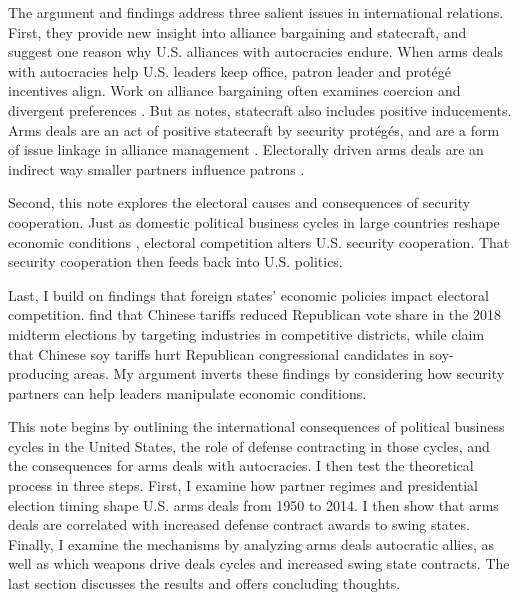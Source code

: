\documentclass[12pt]{article}
\begin{document}


The argument and findings address three salient issues in international relations. 
First, they provide new insight into alliance bargaining and statecraft, and suggest one reason why U.S. alliances with autocracies endure. 
When arms deals with autocracies help U.S. leaders keep office, patron leader and prot{\'e}g{\'e} incentives align.
Work on alliance bargaining often examines coercion and divergent preferences \citep{WolfordKim2017, Resnick2019, Blankenship2020, Beckeretal2023}. %
But as \citet{Baldwin2020} notes, statecraft also includes positive inducements. 
Arms deals are an act of positive statecraft by security prot{\'e}g{\'e}s, and are a form of issue linkage in alliance management \citep{Davis2008, Poast2013}.
Electorally driven arms deals are an indirect way smaller partners influence patrons \citep{Keohane1971}.


Second, this note explores the electoral causes and consequences of security cooperation. 
Just as domestic political business cycles in large countries reshape economic conditions \citep{Kayser2006}, electoral competition alters U.S. security cooperation. 
That security cooperation then feeds back into U.S. politics. 


Last, I build on findings that foreign states' economic policies impact electoral competition. 
\citet{KimMargalit2021} find that Chinese tariffs reduced Republican vote share in the 2018 midterm elections by targeting industries in competitive districts, while \citet{ChyzhUrbatsch2021} claim that Chinese soy tariffs hurt Republican congressional candidates in soy-producing areas. 
My argument inverts these findings by considering how security partners can help leaders manipulate economic conditions. 


This note begins by outlining the international consequences of political business cycles in the United States, the role of defense contracting in those cycles, and the consequences for arms deals with autocracies. 
I then test the theoretical process in three steps. 
First, I examine how partner regimes and presidential election timing shape U.S. arms deals from 1950 to 2014.
I then show that arms deals are correlated with increased defense contract awards to swing states.
Finally, I examine the mechanisms by analyzing arms deals autocratic allies, as well as which weapons drive deals cycles and increased swing state contracts.
The last section discusses the results and offers concluding thoughts.
\end{document}
